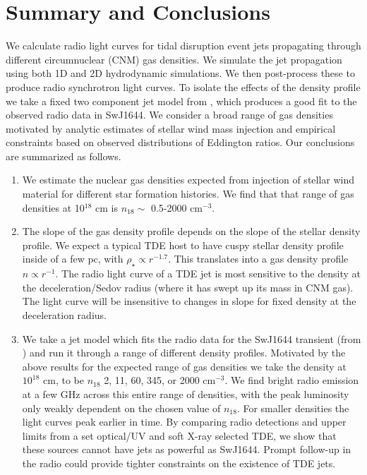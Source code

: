 \documentclass[usenatbib,fleqn]{mnras}
\begin{document}
\section{Summary and Conclusions}
\label{sec:conc}

We calculate radio light curves for tidal disruption event jets
propagating through different circumnuclear (CNM) gas densities. We
simulate the jet propagation using both 1D and 2D hydrodynamic
simulations. We then post-process these to produce radio synchrotron
light curves. To isolate the effects of the density profile we take a
fixed two component jet model from \citet{Mimica+2015}, which produces
a good fit to the observed radio data in SwJ1644. We
consider a broad range of gas densities motivated by analytic
estimates of stellar wind mass injection and empirical constraints
based on observed distributions of Eddington ratios. Our conclusions
are summarized as follows.

\begin{enumerate}
\item We estimate the nuclear gas densities expected from injection of
  stellar wind material for different star formation histories. We
  find that that range of gas densities at 10$^{18}$ cm is $n_{18}
  \sim$ 0.5-2000 cm$^{-3}$.

\item The slope of the gas density profile depends on the slope of the
  stellar density profile. We expect a typical TDE host to have cuspy
  stellar density profile inside of a few pc, with $\rho_\star
  \propto r^{-1.7}$. This translates into a gas density profile $n
  \propto r^{-1}$. The radio light curve of a TDE jet is most
  sensitive to the density at the deceleration/Sedov radius (where it
  has swept up its mass in CNM gas). The light curve will be
  insensitive to changes in slope for fixed density at the
  deceleration radius.

\item We take a jet model which fits the radio data for the SwJ1644
  transient (from \citealt{Mimica+2015}) and run it through a range of
  different density profiles. Motivated by the above results for the
  expected range of gas densities we take the density at $10^{18}$ cm,
  to be $n_{18}$ 2, 11, 60, 345, or 2000 cm$^{-3}$. We find bright radio
  emission at a few GHz across this entire range of densities, with
  the peak luminosity only weakly dependent on the chosen value of
  $n_{18}$.  For smaller densities the light curves peak earlier in
  time. By comparing radio detections and upper limits from a set
  optical/UV and soft X-ray selected TDE, we show that these sources
  cannot have jets as powerful as SwJ1644. Prompt follow-up in the
  radio could provide tighter constraints on the existence of TDE
  jets.
\end{enumerate}
\end{document}
